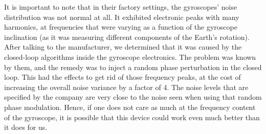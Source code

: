 It is important to note that in their factory settings, the gyroscopes' noise distribution was not normal at all. It exhibited electronic peaks with many harmonics, at frequencies that were varying as a function of the gyroscope inclination (as it was measuring different components of the Earth's rotation). After talking to the manufacturer, we determined that it was caused by the closed-loop algorithms inside the gyroscope electronics. The problem was known by them, and the remedy was to inject a random phase perturbation in the closed loop. This had the effects to get rid of those frequency peaks, at the cost of increasing the overall noise variance by a factor of 4. The noise levels that are specified by the company are very close to the noise seen when using that random phase modulation. Hence, if one does not care as much at the frequency content of the gyroscope, it is possible that this device could work even much better than it does for us.


